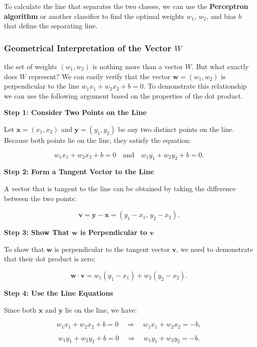 \documentclass[11pt]{article}
\begin{document}
To calculate the line that separates the two classes, we can use the
\textbf{Perceptron algorithm} or another classifier to find the optimal
weights $w_1$, $w_2$, and bias $b$ that define the separating
line.

    \subsubsection{\texorpdfstring{Geometrical Interpretation of the Vector
$W$}{Geometrical Interpretation of the Vector W}}\label{geometrical-interpretation-of-the-vector-w}

the set of weights $(w_1, w_2)$ is nothing more than a vector $W$.
But what exactly does $W$ represent? We can easily verify that the
vector $\mathbf{w} = (w_1, w_2)$ is perpendicular to the line
$w_1 x_1 + w_2 x_2 + b = 0$. To demonstrate this relationship we can
use the following argument based on the properties of the dot product.

\textbf{Step 1: Consider Two Points on the Line}

Let $\mathbf{x} = (x_1, x_2)$ and $\mathbf{y} = (y_1, y_2)$ be any
two distinct points on the line. Because both points lie on the line,
they satisfy the equation:

$$
w_1 x_1 + w_2 x_2 + b = 0 \quad \text{and} \quad w_1 y_1 + w_2 y_2 + b = 0.
$$

\textbf{Step 2: Form a Tangent Vector to the Line}

A vector that is tangent to the line can be obtained by taking the
difference between the two points:

$$
\mathbf{v} = \mathbf{y} - \mathbf{x} = (y_1 - x_1, \, y_2 - x_2).
$$

\textbf{Step 3: Show That $\mathbf{w}$ is Perpendicular to
$\mathbf{v}$}

To show that $\mathbf{w}$ is perpendicular to the tangent vector
$\mathbf{v}$, we need to demonstrate that their dot product is zero:

$$
\mathbf{w} \cdot \mathbf{v} = w_1 (y_1 - x_1) + w_2 (y_2 - x_2).
$$

\textbf{Step 4: Use the Line Equations}

Since both $\mathbf{x}$ and $\mathbf{y}$ lie on the line, we have:

$$
w_1 x_1 + w_2 x_2 + b = 0 \quad \Rightarrow \quad w_1 x_1 + w_2 x_2 = -b,
$$

$$
w_1 y_1 + w_2 y_2 + b = 0 \quad \Rightarrow \quad w_1 y_1 + w_2 y_2 = -b.
$$
\end{document}

